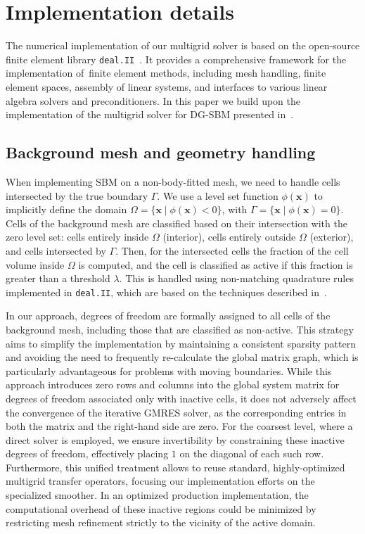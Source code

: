 \documentclass{elsarticle}
\begin{document}
\section{Implementation details}
\label{sec:implementation}
The numerical implementation of our multigrid solver is based on the open-source finite element library
\texttt{deal.II}~\cite{dealii2024}. It provides a comprehensive framework for the implementation of~finite
element methods, including mesh handling, finite element spaces, assembly of linear systems, and interfaces to various
linear algebra solvers and preconditioners. In this paper we build upon the implementation of the multigrid solver for
DG-SBM presented in~\cite{wichrowski2025geometric}.

\subsection{Background mesh and geometry handling}
When implementing SBM on a non-body-fitted mesh, we need to handle cells intersected by the true boundary $\Gamma$. We
use a level set function $\phi(\mathbf{x})$ to implicitly define the domain $\Omega = \{\mathbf{x} \mid
    \phi(\mathbf{x}) < 0\}$, with $\Gamma = \{\mathbf{x} \mid \phi(\mathbf{x}) = 0\}$. Cells of the background mesh are
classified based on their intersection with the zero level set: cells entirely inside $\Omega$ (interior), cells
entirely outside $\Omega$ (exterior), and cells intersected by $\Gamma$. Then, for the intersected cells the fraction
of the cell volume inside $\Omega$ is computed, and the cell is classified as active if this fraction is greater than a
threshold $\lambda$. This is handled using non-matching quadrature rules implemented in \texttt{deal.II}, which are
based on the techniques described in~\cite{saye2015high}.

In our approach, degrees of freedom are formally assigned to all cells of the background mesh, including those that are
classified as non-active. This strategy aims to simplify the implementation by maintaining a consistent sparsity
pattern and avoiding the need to frequently re-calculate the global matrix graph, which is particularly advantageous
for problems with moving boundaries. While this approach introduces zero rows and columns into the global system matrix
for degrees of freedom associated only with inactive cells, it does not adversely affect the convergence of the
iterative GMRES solver, as the corresponding entries in both the matrix and the right-hand side are zero. For the
coarsest level, where a direct solver is employed, we ensure invertibility by constraining these inactive degrees of
freedom, effectively placing $1$ on the diagonal of each such row. Furthermore, this unified treatment allows to reuse
standard, highly-optimized multigrid transfer operators, focusing our implementation efforts on the specialized
smoother. In an optimized production implementation, the computational overhead of these inactive regions could be
minimized by restricting mesh refinement strictly to the vicinity of the active domain.
\end{document}
